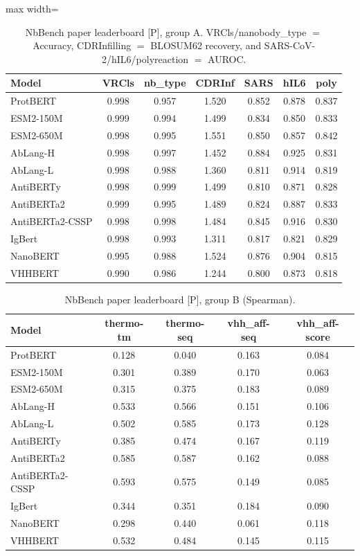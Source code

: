 \begin{table}[h]
\centering
\caption{NbBench paper leaderboard [P], group A. VRCls/nanobody\_type ${=}$
Accuracy, CDRInfilling ${=}$ BLOSUM62 recovery, and
SARS-CoV-2/hIL6/polyreaction ${=}$ AUROC.}
\label{tab:nbbench-full-a}
\small
\setlength{\tabcolsep}{3.5pt}
\begin{adjustbox}{max width=\textwidth}
\begin{tabular}{@{}lcccccc@{}}
\toprule
Model & VRCls & nb\_type & CDRInf & SARS & hIL6 & poly \\
\midrule
ProtBERT & 0.998 & 0.957 & 1.520 & 0.852 & 0.878 & 0.837 \\
ESM2-150M & 0.999 & 0.994 & 1.499 & 0.834 & 0.850 & 0.833 \\
ESM2-650M & 0.998 & 0.995 & 1.551 & 0.850 & 0.857 & 0.842 \\
AbLang-H & 0.998 & 0.997 & 1.452 & 0.884 & 0.925 & 0.831 \\
AbLang-L & 0.998 & 0.988 & 1.360 & 0.811 & 0.914 & 0.819 \\
AntiBERTy & 0.998 & 0.999 & 1.499 & 0.810 & 0.871 & 0.828 \\
AntiBERTa2 & 0.999 & 0.995 & 1.489 & 0.824 & 0.887 & 0.833 \\
AntiBERTa2-CSSP & 0.998 & 0.998 & 1.484 & 0.845 & 0.916 & 0.830 \\
IgBert & 0.998 & 0.993 & 1.311 & 0.817 & 0.821 & 0.829 \\
NanoBERT & 0.995 & 0.988 & 1.524 & 0.876 & 0.904 & 0.815 \\
VHHBERT & 0.990 & 0.986 & 1.244 & 0.800 & 0.873 & 0.818 \\
\bottomrule
\end{tabular}
\end{adjustbox}
\end{table}

\begin{table}[h]
\centering
\caption{NbBench paper leaderboard [P], group B (Spearman).}
\label{tab:nbbench-full-b}
\small
\begin{tabular}{@{}lcccc@{}}
\toprule
Model & thermo-tm & thermo-seq & vhh\_aff-seq & vhh\_aff-score \\
\midrule
ProtBERT & 0.128 & 0.040 & 0.163 & 0.084 \\
ESM2-150M & 0.301 & 0.389 & 0.170 & 0.063 \\
ESM2-650M & 0.315 & 0.375 & 0.183 & 0.089 \\
AbLang-H & 0.533 & 0.566 & 0.151 & 0.106 \\
AbLang-L & 0.502 & 0.585 & 0.173 & 0.128 \\
AntiBERTy & 0.385 & 0.474 & 0.167 & 0.119 \\
AntiBERTa2 & 0.585 & 0.587 & 0.162 & 0.088 \\
AntiBERTa2-CSSP & 0.593 & 0.575 & 0.149 & 0.085 \\
IgBert & 0.344 & 0.351 & 0.184 & 0.090 \\
NanoBERT & 0.298 & 0.440 & 0.061 & 0.118 \\
VHHBERT & 0.532 & 0.484 & 0.145 & 0.115 \\
\bottomrule
\end{tabular}
\end{table}
